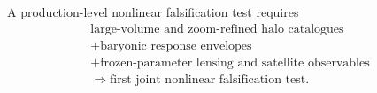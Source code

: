 A production-level nonlinear falsification test requires
\begin{equation}
\boxed{
\begin{gathered}
\text{large-volume and zoom-refined halo catalogues}\\
+\text{baryonic response envelopes}\\
+\text{frozen-parameter lensing and satellite observables}\\
\Longrightarrow
\text{first joint nonlinear falsification test}.
\end{gathered}}
\label{eq:halo-open-requirements}
\end{equation}

